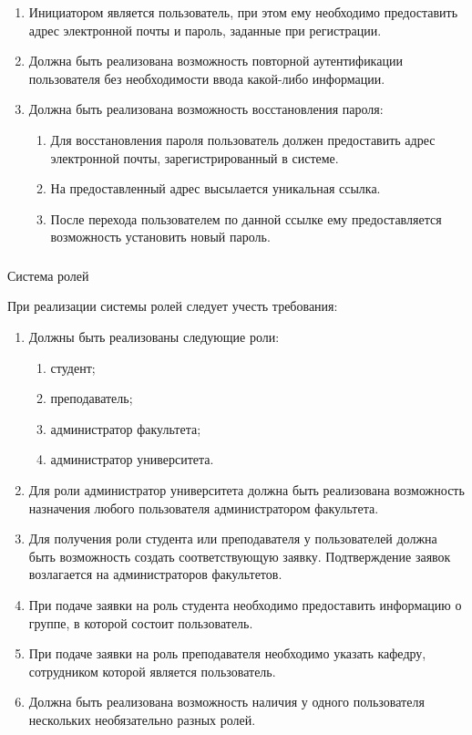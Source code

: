 \begin{enumerate}
	\item Инициатором является пользователь, при этом ему необходимо предоставить адрес электронной почты и пароль, заданные при регистрации.
	\item Должна быть реализована возможность повторной аутентификации пользователя без необходимости ввода какой-либо информации.
	\item Должна быть реализована возможность восстановления пароля:
	\begin{enumerate}
		\item Для восстановления пароля пользователь должен предоставить адрес электронной почты, зарегистрированный в системе.
		\item На предоставленный адрес высылается уникальная ссылка.
		\item После перехода пользователем по данной ссылке ему предоставляется возможность установить новый пароль.
	\end{enumerate}
\end{enumerate}

\subsubsection{} Система ролей
\label{sec:domain:specification:roles}

При реализации системы ролей следует учесть требования:

\begin{enumerate}
	\item Должны быть реализованы следующие роли:
	\begin{enumerate}
		\item студент;
		\item преподаватель;
		\item администратор факультета;
		\item администратор университета.
	\end{enumerate}
	\item Для роли администратор университета должна быть реализована возможность назначения любого пользователя администратором факультета.
	\item Для получения роли студента или преподавателя у пользователей дол\-ж\-на быть возможность создать соответствующую заявку. Подтверждение заявок возлагается на администраторов факультетов.
	\item При подаче заявки на роль студента необходимо предоставить информацию о группе, в которой состоит пользователь.
	\item При подаче заявки на роль преподавателя необходимо указать кафедру, сотрудником которой является пользователь.
	\item Должна быть реализована возможность наличия у одного пользователя нескольких необязательно разных ролей.
\end{enumerate}

